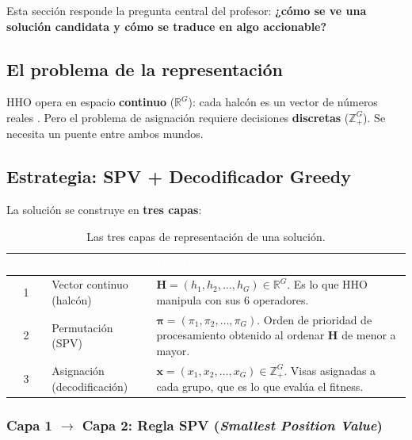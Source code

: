 \documentclass[12pt,letterpaper]{article}
\begin{document}
Esta sección responde la pregunta central del profesor: \textbf{¿cómo se ve una solución candidata y cómo se traduce en algo accionable?}

\subsection{El problema de la representación}

HHO opera en espacio \textbf{continuo} ($\mathbb{R}^G$): cada halcón es un vector de números reales \parencite{heidari2019}. Pero el problema de asignación requiere decisiones \textbf{discretas} ($\mathbb{Z}^G_{+}$). Se necesita un puente entre ambos mundos.

\subsection{Estrategia: SPV + Decodificador Greedy}

La solución se construye en \textbf{tres capas}:

\begin{table}[H]
\centering
\caption{Las tres capas de representación de una solución.}
\label{tab:capas}
\renewcommand{\arraystretch}{1.5}
\begin{tabular}{clp{7cm}}
\toprule
\rowcolor{tablehead}
\textcolor{white}{\textbf{Capa}} & \textcolor{white}{\textbf{Nombre}} & \textcolor{white}{\textbf{Descripción}} \\
\midrule
1 & Vector continuo (halcón) & $\mathbf{H} = (h_1, h_2, \ldots, h_G) \in \mathbb{R}^G$. Es lo que HHO manipula con sus 6 operadores. \\
\rowcolor{gray!8}
2 & Permutación (SPV) & $\boldsymbol{\pi} = (\pi_1, \pi_2, \ldots, \pi_G)$. Orden de prioridad de procesamiento obtenido al ordenar $\mathbf{H}$ de menor a mayor. \\
3 & Asignación (decodificación) & $\mathbf{x} = (x_1, x_2, \ldots, x_G) \in \mathbb{Z}^G_{+}$. Visas asignadas a cada grupo, que es lo que evalúa el fitness. \\
\bottomrule
\end{tabular}
\end{table}

\subsubsection{\texorpdfstring{Capa 1 $\rightarrow$ Capa 2: Regla SPV (\textit{Smallest Position Value})}{Capa 1 → Capa 2: Regla SPV (Smallest Position Value)}}
\end{document}
